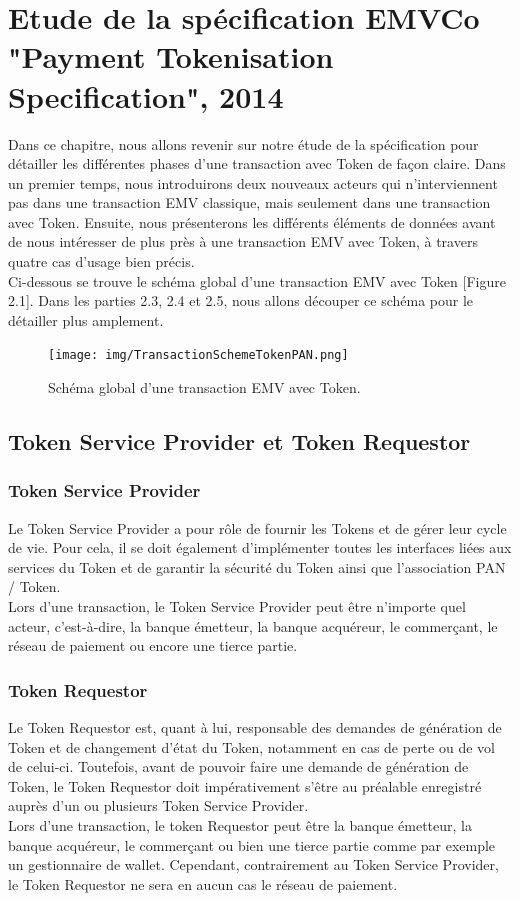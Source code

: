 \documentclass{report}
\begin{document}
\chapter{Etude de la spécification EMVCo "Payment Tokenisation Specification", 2014}
Dans ce chapitre, nous allons revenir sur notre étude de la spécification pour détailler les différentes phases d'une transaction avec Token de façon claire. Dans un premier temps, nous introduirons deux nouveaux acteurs qui n'interviennent pas dans une transaction EMV classique, mais seulement dans une transaction avec Token. Ensuite, nous présenterons les différents éléments de données avant de nous intéresser de plus près à une transaction EMV avec Token, à travers quatre cas d'usage bien précis.\\

\noindent
Ci-dessous se trouve le schéma global d'une transaction EMV avec Token [Figure 2.1]. Dans les parties 2.3, 2.4 et 2.5, nous allons découper ce schéma pour le détailler plus amplement.

\begin{figure}[!ht]
    \centering
			\texttt{[image: img/TransactionSchemeTokenPAN.png]}
			\caption{\label{TransactionScheme} Schéma global d'une transaction EMV avec Token.}			
\end{figure}

 
\section{Token Service Provider et Token Requestor}
\subsection{Token Service Provider}
Le Token Service Provider a pour rôle de fournir les Tokens et de gérer leur cycle de vie. Pour cela, il se doit également d'implémenter toutes les interfaces liées aux services du Token et de garantir la sécurité du Token ainsi que l'association PAN / Token.\\
Lors d'une transaction, le Token Service Provider peut être n'importe quel acteur, c'est-à-dire, la banque émetteur, la banque acquéreur, le commerçant, le réseau de paiement ou encore une tierce partie.

\subsection{Token Requestor}
Le Token Requestor est, quant à lui, responsable des demandes de génération de Token et de changement d'état du Token, notamment en cas de perte ou de vol de celui-ci. Toutefois, avant de pouvoir faire une demande de génération de Token, le Token Requestor doit impérativement s'être au préalable enregistré auprès d'un ou plusieurs Token Service Provider.\\
Lors d'une transaction, le token Requestor peut être la banque émetteur, la banque acquéreur, le commerçant ou bien une tierce partie comme par exemple un gestionnaire de wallet. Cependant, contrairement au Token Service Provider, le Token Requestor ne sera en aucun cas le réseau de paiement.
\end{document}
